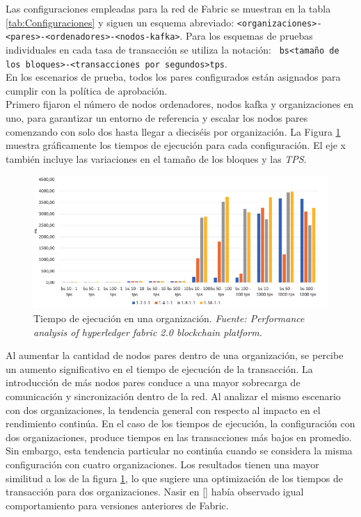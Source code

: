 Las configuraciones empleadas para la red de Fabric se muestran en la tabla \ref{tab:Configuraciones} y siguen un esquema abreviado: \texttt{<organizaciones>-<pares>-<ordenadores>-<nodos-kafka>}. Para los esquemas de pruebas individuales en cada tasa de transacci\'on se utiliza la notaci\'on: \texttt{ bs<tama\~no de los bloques>-<transacciones por segundos>tps}.\\

En los escenarios de prueba, todos los pares configurados est\'an asignados para cumplir con la pol\'itica de aprobaci\'on.\\

Primero fijaron el n\'umero de nodos ordenadores, nodos kafka y organizaciones en uno, para garantizar un entorno de referencia y escalar los nodos pares comenzando con solo dos hasta llegar a diecis\'eis por organizaci\'on. La Figura \ref{EscalaParesUnaOrganizacion} muestra gr\'aficamente los tiempos de ejecuci\'on para cada configuraci\'on. El eje x tambi\'en incluye las variaciones en el tama\~no de los bloques y las \emph{TPS}.\\

\begin{figure}[h]
\centering
\includegraphics[width=0.6\linewidth]{Graphics/EscalaParesUnaOrganizacion.png}
\caption{Tiempo de ejecuci\'on en una organizaci\'on. \emph{Fuente: Performance analysis of hyperledger fabric 2.0 blockchain platform.}}
\label{EscalaParesUnaOrganizacion}
\end{figure}

Al aumentar la cantidad de nodos pares dentro de una organizaci\'on, se percibe un aumento significativo en el tiempo de ejecuci\'on de la transacci\'on. La introducci\'on de m\'as nodos pares conduce a una mayor sobrecarga de comunicaci\'on y sincronizaci\'on dentro de la red. Al analizar el mismo escenario con dos organizaciones, la tendencia general con respecto al impacto en el rendimiento contin\'ua. En el caso de los tiempos de ejecuci\'on, la configuraci\'on con dos organizaciones, produce tiempos en las transacciones m\'as bajos en promedio. Sin embargo, esta tendencia particular no contin\'ua cuando se considera la misma configuraci\'on con cuatro organizaciones. Los resultados tienen una mayor similitud a los de la figura \ref{EscalaParesUnaOrganizacion}, lo que sugiere una optimizaci\'on de los tiempos de transacci\'on para dos organizaciones. Nasir en [\cite{nasir2018performance}] hab\'ia observado igual comportamiento para versiones anteriores de Fabric.\\

